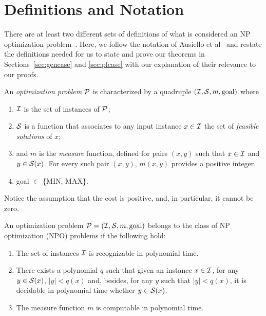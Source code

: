 \section{Definitions and Notation} \label{sec:prelim}

There are at least two different sets of definitions of what is considered an NP optimization problem~\cite{orponen1987approximation, ausiello1999complexity}. Here, we follow the notation of Ausiello et al~\cite{ausiello1999complexity} and restate the definitions needed for us to state and prove our theorems in Sections~\ref{sec:gencase} and \ref{sec:plcase} with our explanation of their relevance to our proofs.

\begin{definition}An {\em optimization problem} $\P$ is characterized by a quadruple $(\I,\S,m,\text{goal})$ where
\begin{enumerate}
\item $\I$ is the set of instances of $\P$;
\item $\S$ is a function that associates to any input instance $x\in\I$ the set of {\em feasible solutions} of $x$;
\item and $m$ is the {\em measure} function, defined for pairs $(x,y)$ such that $x\in\I$ and $y\in\S(x)$. For every such pair $(x,y)$, $m(x,y)$ provides a  positive integer.
\item goal $\in$ \{MIN, MAX\}.


\end{enumerate}
\end{definition}
\noindent
Notice the assumption that the cost is positive, and, in particular, it cannot be zero.


\begin{definition} An optimization problem $\P = (\I,\S,m, \text{goal})$ belongs to the class of NP optimization (NPO) problems if the following hold:
\begin{enumerate}
\item The set of instances $\I$ is recognizable in polynomial time.
\item There exists a polynomial $q$ such that given an instance $x\in\I$, for any $y\in \S(x)$, $|y| < q(x)$ and, besides, for any $y$ such that $|y| < q(x)$, it is decidable in polynomial time whether $y\in\S(x)$.
\item The measure function $m$ is computable in polynomial time.
\end{enumerate}
\end{definition}


